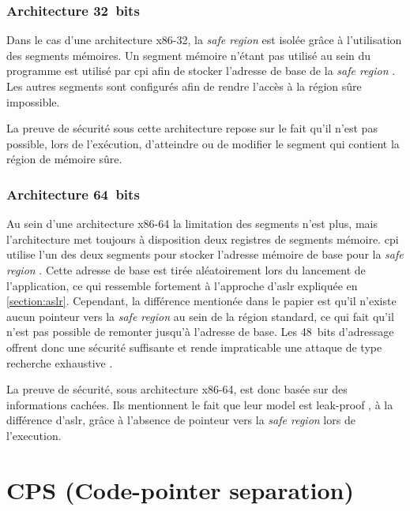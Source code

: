 \subsubsection{Architecture 32~bits}

Dans le cas d'une architecture x86-32, la \og \textit{safe region} \fg est isolée grâce à l'utilisation des segments mémoires. Un segment mémoire n'étant pas utilisé au sein du programme est utilisé par \gls{cpi} afin de stocker l'adresse de base de la \og \textit{safe region} \fg. Les autres segments sont configurés afin de rendre l'accès à la région sûre impossible.


La preuve de sécurité sous cette architecture repose sur le fait qu'il n'est pas possible, lors de l'exécution, d'atteindre ou de modifier le segment qui contient la région de mémoire sûre.

\subsubsection{Architecture 64~bits}

Au sein d'une architecture x86-64 la limitation des segments n'est plus, mais l'architecture met toujours à disposition deux registres de segments mémoire. \gls{cpi} utilise l'un des deux segments pour stocker l'adresse mémoire de base pour la \og \textit{safe region} \fg. Cette adresse de base est tirée aléatoirement lors du lancement de l'application, ce qui ressemble fortement à l'approche d'\gls{aslr} expliquée en \autoref{section:aslr}. Cependant, la différence mentionée dans le papier est qu'il n'existe aucun pointeur vers la \og \textit{safe region} \fg au sein de la région standard, ce qui fait qu'il n'est pas possible de remonter jusqu'à l'adresse de base. Les 48~bits d'adressage offrent donc une sécurité suffisante et rende impraticable une attaque de type \og recherche exhaustive \fg.

La preuve de sécurité, sous architecture x86-64, est donc basée sur des informations cachées. Ils mentionnent le fait que leur model est \og leak-proof \fg, à la différence d'\gls{aslr}, grâce à l'absence de pointeur vers la \og \textit{safe region} \fg lors de l'execution.


\section{CPS (Code-pointer separation)}

